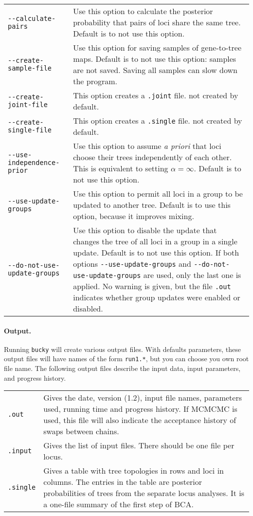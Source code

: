 \documentclass[12pt,english,final,letterpaper]{article}
\begin{document}
\noindent
\hspace*{-.3in}
\begin{tabular}{l|p{4.4in}}
\verb+--calculate-pairs+&Use this option to calculate the 
posterior probability that pairs of loci share the same tree. Default is 
to {\sc not} use this option.\\
\verb+--create-sample-file+&Use this option for saving samples of gene-to-tree maps.
Default is to {\sc not} use this option: samples are not saved. Saving all samples can slow down the program.\\
\verb+--create-joint-file+&This option creates a {\tt .joint} file. 
{\sc not} created by default.\\
\verb+--create-single-file+&This option creates a {\tt .single} file. 
{\sc not} created by default. \\
\verb+--use-independence-prior+&Use this option to assume {\it a priori}
that loci choose their trees independently of each other. This is equivalent
to setting $\alpha=\infty$. Default is to {\sc not} use this option.\\
\verb+--use-update-groups+&Use this option to permit all loci 
in a group to be updated to another tree. Default is to use this option,
because it improves mixing.\\
\verb+--do-not-use-update-groups+&Use this option to disable the update that 
changes the tree of all loci in a group in a single update. Default is to 
{\sc not} use this option. If both options \verb+--use-update-groups+ and 
\verb+--do-not-use-update-groups+ are used, only the last one is applied. 
No warning is given, but the file {\tt .out} indicates
whether group updates were enabled or disabled.\\
\end{tabular}


\paragraph{Output.}
Running {\tt bucky} will create various output files. With defaults 
parameters, these output files will have names of the form {\tt run1.*}, 
but you can choose you own root file name.
The following output files describe the input data, input parameters, and
progress history.
\bigskip

\noindent
\begin{tabular}{l|p{5.7in}}
{\tt .out}& Gives the date, version (1.2), input file names, 
parameters used, running time and progress history. If MCMCMC is used, 
this file will also indicate the acceptance history of swaps between chains.\\
{\tt .input}& Gives the list of input files. There should be one file 
per locus.\\
{\tt .single}& Gives a table with tree topologies in rows and loci in 
columns. The entries in the table are posterior probabilities of trees from the
separate locus analyses. It is a one-file summary of the first step of BCA.\\
\end{tabular}
\bigskip\bigskip
\end{document}
